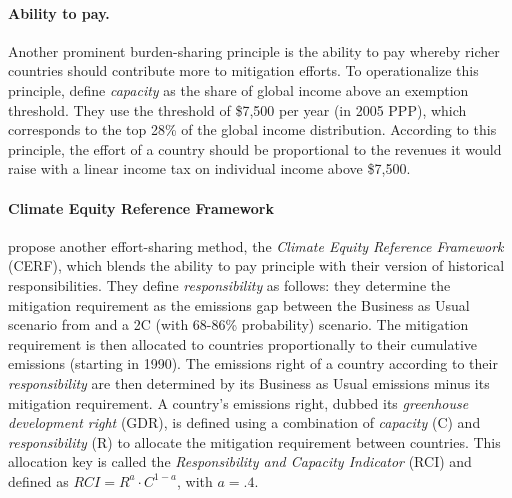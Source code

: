 \paragraph{Ability to pay.} Another prominent burden-sharing principle is the ability to pay whereby richer countries should contribute more to mitigation efforts. To operationalize this principle, \citet{baer_greenhouse_2008} define \textit{capacity} as the share of global income above an exemption threshold. They use the threshold of \$7,500 per year (in 2005 PPP), which corresponds to the top 28\% of the global income distribution. According to this principle, the effort of a country should be proportional to the revenues it would raise with a linear income tax on individual income above \$7,500. 

\paragraph{Climate Equity Reference Framework} \citet{baer_greenhouse_2008} %
propose another effort-sharing method, %
the \textit{Climate Equity Reference Framework} (CERF), which blends the ability to pay principle with their version of historical responsibilities. They define \textit{responsibility} as follows: they determine the mitigation requirement as the emissions gap between the Business as Usual scenario from \citet{iea_world_2007} and a 2\textdegree{}C (with 68-86\% probability) scenario. The mitigation requirement is then allocated to countries proportionally to their cumulative emissions (starting in 1990). The emissions right of a country according to their \textit{responsibility} are then determined by its Business as Usual emissions minus its mitigation requirement. A country's emissions right, dubbed its \textit{greenhouse development right} (GDR), 
is defined using a combination of \textit{capacity} (C) and \textit{responsibility} (R) to allocate the mitigation requirement between countries. This allocation key is called the \textit{Responsibility and Capacity Indicator} (RCI) and defined as $RCI = R^{a}\cdot C^{1-a}$, with $a=.4$. %


